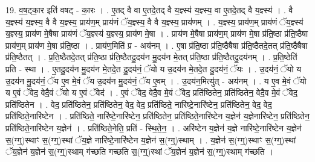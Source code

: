 \documentclass[17pt]{extarticle}
\begin{document}
19. व॒ष॒ट्का॒र इति॑ वषट् - का॒रः । . ए॒तद् वै वा ए॒तदे॒तद् वै य॒ज्ञ्स्य॑ य॒ज्ञ्स्य॒ वा ए॒तदे॒तद् वै य॒ज्ञ्स्य॑ । . वै य॒ज्ञ्स्य॑ य॒ज्ञ्स्य॒ वै वै य॒ज्ञ्स्य॒ प्राय॑ण॒म् प्राय॑णं ॅय॒ज्ञ्स्य॒ वै वै य॒ज्ञ्स्य॒ प्राय॑णम् । . य॒ज्ञ्स्य॒ प्राय॑ण॒म् प्राय॑णं ॅय॒ज्ञ्स्य॑ य॒ज्ञ्स्य॒ प्राय॑ण मे॒षैषा प्राय॑णं ॅय॒ज्ञ्स्य॑ य॒ज्ञ्स्य॒ प्राय॑ण मे॒षा । . प्राय॑ण मे॒षैषा प्राय॑ण॒म् प्राय॑ण मे॒षा प्र॑ति॒ष्ठा प्र॑ति॒ष्ठैषा प्राय॑ण॒म् प्राय॑ण मे॒षा प्र॑ति॒ष्ठा । . प्राय॑ण॒मिति॑ प्र - अय॑नम् । . ए॒षा प्र॑ति॒ष्ठा प्र॑ति॒ष्ठैषैषा प्र॑ति॒ष्ठैतदे॒तत् प्र॑ति॒ष्ठैषैषा प्र॑ति॒ष्ठैतत् । . प्र॒ति॒ष्ठैतदे॒तत् प्र॑ति॒ष्ठा प्र॑ति॒ष्ठैतदु॒दय॑न मु॒दय॑न मे॒तत् प्र॑ति॒ष्ठा प्र॑ति॒ष्ठैतदु॒दय॑नम् । . प्र॒ति॒ष्ठेति॑ प्रति - स्था । . ए॒तदु॒दय॑न मु॒दय॑न मे॒तदे॒त दु॒दय॑नं॒ ॅयो य उ॒दय॑न मे॒तदे॒त दु॒दय॑नं॒ ॅयः । . उ॒दय॑नं॒ ॅयो य उ॒दय॑न मु॒दय॑नं॒ ॅय ए॒व मे॒वं ॅय उ॒दय॑न मु॒दय॑नं॒ ॅय ए॒वम् । . उ॒दय॑न॒मित्यु॑त् - अय॑नम् । . य ए॒व मे॒वं ॅयो य ए॒वं ॅवेद॒ वेदै॒वं ॅयो य ए॒वं ॅवेद॑ । . ए॒वं ॅवेद॒ वेदै॒व मे॒वं ॅवेद॒ प्रति॑ष्ठितेन॒ प्रति॑ष्ठितेन॒ वेदै॒व मे॒वं ॅवेद॒ प्रति॑ष्ठितेन । . वेद॒ प्रति॑ष्ठितेन॒ प्रति॑ष्ठितेन॒ वेद॒ वेद॒ प्रति॑ष्ठिते॒ नारि॑ष्टे॒नारि॑ष्टेन॒ प्रति॑ष्ठितेन॒ वेद॒ वेद॒ प्रति॑ष्ठिते॒नारि॑ष्टेन । . प्रति॑ष्ठिते॒ नारि॑ष्टे॒नारि॑ष्टेन॒ प्रति॑ष्ठितेन॒ प्रति॑ष्ठिते॒नारि॑ष्टेन य॒ज्ञेन॑ य॒ज्ञेनारि॑ष्टेन॒ प्रति॑ष्ठितेन॒ प्रति॑ष्ठिते॒नारि॑ष्टेन य॒ज्ञेन॑ । . प्रति॑ष्ठिते॒नेति॒ प्रति॑ - स्थि॒ते॒न॒ । . अरि॑ष्टेन य॒ज्ञेन॑ य॒ज्ञे नारि॑ष्टे॒नारि॑ष्टेन य॒ज्ञेन॑ स॒(ग्ग्॒)स्थाꣳ स॒(ग्ग्॒)स्थां ॅय॒ज्ञे नारि॑ष्टे॒नारि॑ष्टेन य॒ज्ञेन॑ स॒(ग्ग्॒)स्थाम् । . य॒ज्ञेन॑ स॒(ग्ग्॒)स्थाꣳ स॒(ग्ग्॒)स्थां ॅय॒ज्ञेन॑ य॒ज्ञेन॑ स॒(ग्ग्॒)स्थाम् ग॑च्छति गच्छति स॒(ग्ग्॒)स्थां ॅय॒ज्ञेन॑ य॒ज्ञेन॑ स॒(ग्ग्॒)स्थाम् ग॑च्छति । \newline
\end{document}
